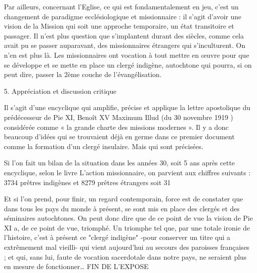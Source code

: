 Par ailleurs, concernant l’Eglise, ce qui est fondamentalement en jeu, c’est un changement de paradigme ecclésiologique et missionnaire : il s’agit d’avoir une vision de la Mission qui soit une approche temporaire, un état transitoire et passager. Il n’est plus question que s’implantent durant des siècles, comme cela avait pu se passer auparavant, des missionnaires étrangers qui s’inculturent. On n’en est plus là. Les missionnaires ont vocation à tout mettre en œuvre pour que se développe et se mette en place un clergé indigène, autochtone qui pourra, si on peut dire, passer la 2ème couche de l’évangélisation.

5.  Appréciation et discussion critique 

Il s’agit d’une encyclique qui amplifie, précise et applique la lettre apostolique du prédécesseur de Pie XI, Benoît XV Maximum Illud (du 30 novembre 1919 ) considérée comme « la grande charte des missions modernes ». Il y a donc beaucoup d’idées qui se trouvaient déjà en germe dans ce premier document comme la formation d’un clergé insulaire. Mais qui sont précisées. 

Si l’on fait un bilan de la situation dans les années 30, soit 5 ans après cette encyclique, selon le livre L’action missionnaire, on parvient aux chiffres suivants : 3734 prêtres indigènes et 8279 prêtres étrangers soit 31%

Et si l’on prend, pour finir, un regard contemporain, force est de constater que dans tous les pays du monde à présent, se sont mis en place des clergés et des séminaires autochtones. On peut donc dire que de ce point de vue la vision de Pie XI a, de ce point de vue, triomphé.  Un triomphe tel que, par une totale ironie de l’histoire, c’est à présent ce "clergé indigène" -pour conserver un titre qui a extrêmement mal vieilli- qui vient aujourd’hui au secours des paroisses françaises ; et qui, sans lui, faute de vocation sacerdotale dans notre pays, ne seraient plus en mesure de fonctionner…               
FIN DE L’EXPOSE
